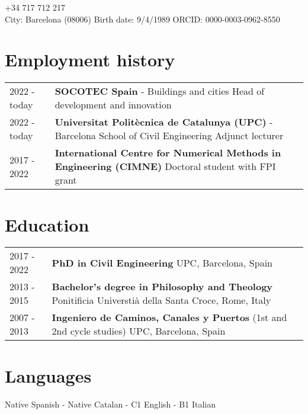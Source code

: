 \documentclass[12pt]{article}
\author{Miguel Masó, PhD}
\begin{document}
\maketitle
{} \qquad +34 717 712 217 \\
City: Barcelona (08006) \qquad
Birth date: 9/4/1989 \qquad
ORCID: 0000-0003-0962-8550


\section{Employment history}
\begin{tabularx}{\linewidth}{lX}
    2022 - today &
    \textbf{SOCOTEC Spain} - Buildings and cities \newline
    Head of development and innovation \\

    2022 - today &
    \textbf{Universitat Politècnica de Catalunya (UPC)} - Barcelona School of Civil Engineering \newline
    Adjunct lecturer \\ 

    2017 - 2022 &
    \textbf{International Centre for Numerical Methods in Engineering (CIMNE)} \newline
    Doctoral student with FPI grant \\
\end{tabularx}


\section{Education}
\begin{tabularx}{\linewidth}{lX}
    2017 - 2022 &
    \textbf{PhD in Civil Engineering} \newline
    UPC, Barcelona, Spain \\

    2013 - 2015 &
    \textbf{Bachelor's degree in Philosophy and Theology} \newline
    Ponitificia Universtià della Santa Croce, Rome, Italy \\

    2007 - 2013 &
    \textbf{Ingeniero de Caminos, Canales y Puertos} (1st and 2nd cycle studies) \newline
    UPC, Barcelona, Spain \\
\end{tabularx}


\section{Languages}
Native Spanish - Native Catalan - C1 English - B1 Italian
\end{document}
